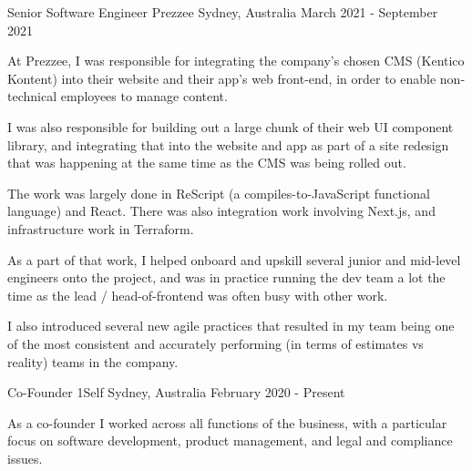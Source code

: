 \begin{cventries}

\cventry
{Senior Software Engineer} %
{Prezzee} %
{Sydney, Australia} %
{March 2021 - September 2021} %
{ %
\begin{cvitems}
\item {At Prezzee, I was responsible for integrating the company's chosen CMS (Kentico Kontent) into their website and their app's web front-end, in order to enable non-technical employees to manage content.}
\item {I was also responsible for building out a large chunk of their web UI component library, and integrating that into the website and app as part of a site redesign that was happening at the same time as the CMS was being rolled out.}
\item {The work was largely done in ReScript (a compiles-to-JavaScript functional language) and React. There was also integration work involving Next.js, and infrastructure work in Terraform.}
\item {As a part of that work, I helped onboard and upskill several junior and mid-level engineers onto the project, and was in practice running the dev team a lot the time as the lead / head-of-frontend was often busy with other work.}
\item {I also introduced several new agile practices that resulted in my team being one of the most consistent and accurately performing (in terms of estimates vs reality) teams in the company.}
\end{cvitems}
\vspace{2.0mm}
}


\cventry
{Co-Founder} %
{1Self} %
{Sydney, Australia} %
{February 2020 - Present} %
{ %
\begin{cvitems}
\item {As a co-founder I worked across all functions of the business, with a particular focus on software development, product management, and legal and compliance issues.}
\end{cvitems}
\vspace{2.0mm} 
}



\end{cventries}
